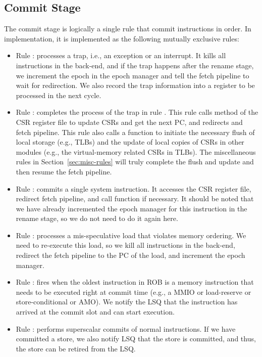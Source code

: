 \subsection{Commit Stage}

The commit stage is logically a single rule that commit instructions in order.
In implementation, it is implemented as the following mutually exclusive rules:
\begin{itemize}
    \item Rule : processes a trap, i.e., an exception or an interrupt.
    It kills all instructions in the back-end, and if the trap happens after the rename stage, we increment the epoch in the epoch manager and tell the fetch pipeline to wait for redirection.
    We also record the trap information into a register to be processed in the next cycle.
    \item Rule : completes the process of the trap in rule .
    This rule calls method  of the CSR register file to update CSRs and get the next PC, and redirects and fetch pipeline.
    This rule also calls a function  to initiate the necessary flush of local storage (e.g., TLBs) and the update of local copies of CSRs in other modules (e.g., the virtual-memory related CSRs in TLBs).
    The miscellaneous rules in Section~\ref{sec:misc-rules} will truly complete the flush and update and then resume the fetch pipeline.
    \item Rule : commits a single system instruction.
    It accesses the CSR register file, redirect fetch pipeline, and call function  if necessary.
    It should be noted that we have already incremented the epoch manager for this instruction in the rename stage, so we do not need to do it again here.
    \item Rule : processes a mis-speculative load that violates memory ordering.
    We need to re-execute this load, so we kill all instructions in the back-end, redirect the fetch pipeline to the PC of the load, and increment the epoch manager.
    \item Rule : fires when the oldest instruction in ROB is a memory instruction that needs to be executed right at commit time (e.g., a MMIO or load-reserve or store-conditional or AMO).
    We notify the LSQ that the instruction has arrived at the commit slot and can start execution.
    \item Rule : performs superscalar commits of normal instructions.
    If we have committed a store, we also notify LSQ that the store is committed, and thus, the store can be retired from the LSQ.
\end{itemize}
